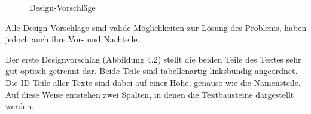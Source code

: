 \begin{figure}[H] 
	\centering
	\hspace{1.0em}
	\hspace{1.0em}
	\caption{Design-Vorschläge}
	\label{fig:liste2}
\end{figure}

Alle Design-Vorschläge sind valide Möglichkeiten zur Lösung des Problems, haben jedoch auch ihre Vor- und Nachteile.

Der erste Designvorschlag (Abbildung 4.2) stellt die beiden Teile des Textes sehr gut optisch getrennt dar. Beide Teile sind tabellenartig linksbündig angeordnet. Die ID-Teile aller Texte sind dabei auf einer Höhe, genauso wie die Namensteile. Auf diese Weise entstehen zwei Spalten, in denen die Textbausteine dargestellt werden.


